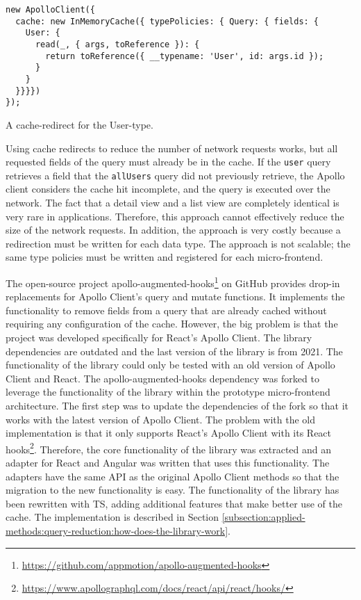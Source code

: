 \ifshowListings
\begin{listing}[H]
  \begin{verbatim}
new ApolloClient({
  cache: new InMemoryCache({ typePolicies: { Query: { fields: {
    User: {
      read(_, { args, toReference }): {
        return toReference({ __typename: 'User', id: args.id });
      }
    }
  }}}})
});
  \end{verbatim}
\caption{A cache-redirect for the User-type.}\label{code:applied-methods:query-reduction:user-cache-redirect}
\end{listing}
\fi

\noindent Using cache redirects to reduce the number of network requests works, but all requested fields of the query must already be in the cache. If the \texttt{user} query retrieves a field that the \texttt{allUsers} query did not previously retrieve, the Apollo client considers the cache hit incomplete, and the query is executed over the network. The fact that a detail view and a list view are completely identical is very rare in applications. Therefore, this approach cannot effectively reduce the size of the network requests. In addition, the approach is very costly because a redirection must be written for each data type. The approach is not scalable; the same type policies must be written and registered for each micro-frontend.

\bigskip

\noindent The open-source project apollo-augmented-hooks\footnote{\url{https://github.com/appmotion/apollo-augmented-hooks}} on GitHub provides drop-in replacements for Apollo Client's query and mutate functions. It implements the functionality to remove fields from a query that are already cached without requiring any configuration of the cache. However, the big problem is that the project was developed specifically for React's Apollo Client. The library dependencies are outdated and the last version of the library is from 2021. The functionality of the library could only be tested with an old version of Apollo Client and React. The apollo-augmented-hooks dependency was forked to leverage the functionality of the library within the prototype micro-frontend architecture. The first step was to update the dependencies of the fork so that it works with the latest version of Apollo Client. The problem with the old implementation is that it only supports React's Apollo Client with its React hooks\footnote{\url{https://www.apollographql.com/docs/react/api/react/hooks/}}. Therefore, the core functionality of the library was extracted and an adapter for React and Angular was written that uses this functionality. The adapters have the same \ac{API} as the original Apollo Client methods so that the migration to the new functionality is easy. The functionality of the library has been rewritten with \ac{TS}, adding additional features that make better use of the cache. The implementation is described in Section \ref{subsection:applied-methods:query-reduction:how-does-the-library-work}.

\ifshowAppliedMethodsTestingQueryReduction
  
\fi




